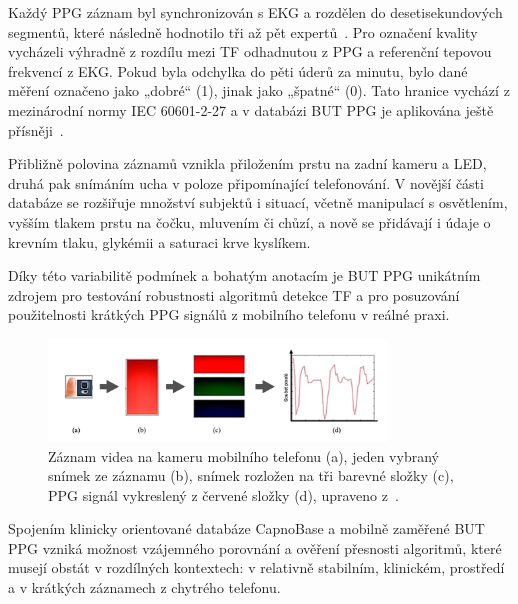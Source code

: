 Každý \acs{PPG} záznam byl synchronizován s \acs{EKG} a rozdělen do desetisekundových segmentů, které následně hodnotilo tři až pět expertů~\cite{BUT_PPG_database}.
Pro označení kvality vycházeli výhradně z rozdílu mezi \acs{TF} odhadnutou z \acs{PPG} a referenční tepovou frekvencí z \acs{EKG}.
Pokud byla odchylka do pěti úderů za minutu, bylo dané měření označeno jako „dobré“ (1), jinak jako „špatné“ (0).
Tato hranice vychází z mezinárodní normy IEC 60601-2-27 a v databázi \acs{BUT PPG} je aplikována ještě přísněji~\cite{BUT_PPG}.

Přibližně polovina záznamů vznikla přiložením prstu na zadní kameru a \acs{LED}, druhá pak snímáním ucha v poloze připomínající telefonování.
V novější části databáze se rozšiřuje množství subjektů i situací, včetně manipulací s osvětlením, vyšším tlakem prstu na čočku, mluvením či chůzí, a nově se přidávají i údaje o krevním tlaku, glykémii a saturaci krve kyslíkem.

Díky této variabilitě podmínek a bohatým anotacím je \acs{BUT PPG} unikátním zdrojem pro testování robustnosti algoritmů detekce \acs{TF} a pro posuzování použitelnosti krátkých \acs{PPG} signálů z mobilního telefonu v reálné praxi.

\begin{figure}[ht]
	\centering
	\includegraphics[width=0.8\textwidth]{./obrazky/videoZaznamPPG.png}
	\caption[Získání PPG signálu pro databázi \acs{BUT PPG}]{Záznam videa na kameru mobilního telefonu (a), jeden vybraný snímek ze záznamu (b), snímek rozložen na tři barevné složky (c), PPG signál vykreslený z červené složky (d), upraveno z~\cite{Siddiqui2016}.}
	\label{fig:videoZaznamPPG}
\end{figure}

Spojením klinicky orientované databáze CapnoBase a mobilně zaměřené \acs{BUT PPG} vzniká možnost vzájemného porovnání a ověření přesnosti algoritmů, které musejí obstát v rozdílných kontextech: v relativně stabilním, klinickém, prostředí a v krátkých záznamech z chytrého telefonu.
